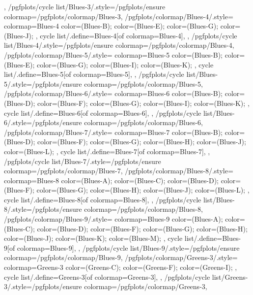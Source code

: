 {{  },
  /pgfplots/cycle list/Blues-3/.style={/pgfplots/ensure colormap={/pgfplots/colormap/Blues-3}},
  /pgfplots/colormap/Blues-4/.style={
    colormap={Blues-4}{
      color=(Blues-B);
      color=(Blues-E);
      color=(Blues-G);
      color=(Blues-J);
    },
    cycle list/.define={Blues-4}{[of colormap=Blues-4]},
  },
  /pgfplots/cycle list/Blues-4/.style={/pgfplots/ensure colormap={/pgfplots/colormap/Blues-4}},
  /pgfplots/colormap/Blues-5/.style={
    colormap={Blues-5}{
      color=(Blues-B);
      color=(Blues-E);
      color=(Blues-G);
      color=(Blues-I);
      color=(Blues-K);
    },
    cycle list/.define={Blues-5}{[of colormap=Blues-5]},
  },
  /pgfplots/cycle list/Blues-5/.style={/pgfplots/ensure colormap={/pgfplots/colormap/Blues-5}},
  /pgfplots/colormap/Blues-6/.style={
    colormap={Blues-6}{
      color=(Blues-B);
      color=(Blues-D);
      color=(Blues-F);
      color=(Blues-G);
      color=(Blues-I);
      color=(Blues-K);
    },
    cycle list/.define={Blues-6}{[of colormap=Blues-6]},
  },
  /pgfplots/cycle list/Blues-6/.style={/pgfplots/ensure colormap={/pgfplots/colormap/Blues-6}},
  /pgfplots/colormap/Blues-7/.style={
    colormap={Blues-7}{
      color=(Blues-B);
      color=(Blues-D);
      color=(Blues-F);
      color=(Blues-G);
      color=(Blues-H);
      color=(Blues-J);
      color=(Blues-L);
    },
    cycle list/.define={Blues-7}{[of colormap=Blues-7]},
  },
  /pgfplots/cycle list/Blues-7/.style={/pgfplots/ensure colormap={/pgfplots/colormap/Blues-7}},
  /pgfplots/colormap/Blues-8/.style={
    colormap={Blues-8}{
      color=(Blues-A);
      color=(Blues-C);
      color=(Blues-D);
      color=(Blues-F);
      color=(Blues-G);
      color=(Blues-H);
      color=(Blues-J);
      color=(Blues-L);
    },
    cycle list/.define={Blues-8}{[of colormap=Blues-8]},
  },
  /pgfplots/cycle list/Blues-8/.style={/pgfplots/ensure colormap={/pgfplots/colormap/Blues-8}},
  /pgfplots/colormap/Blues-9/.style={
    colormap={Blues-9}{
      color=(Blues-A);
      color=(Blues-C);
      color=(Blues-D);
      color=(Blues-F);
      color=(Blues-G);
      color=(Blues-H);
      color=(Blues-J);
      color=(Blues-K);
      color=(Blues-M);
    },
    cycle list/.define={Blues-9}{[of colormap=Blues-9]},
  },
  /pgfplots/cycle list/Blues-9/.style={/pgfplots/ensure colormap={/pgfplots/colormap/Blues-9}},
  /pgfplots/colormap/Greens-3/.style={
    colormap={Greens-3}{
      color=(Greens-C);
      color=(Greens-F);
      color=(Greens-I);
    },
    cycle list/.define={Greens-3}{[of colormap=Greens-3]},
  },
  /pgfplots/cycle list/Greens-3/.style={/pgfplots/ensure colormap={/pgfplots/colormap/Greens-3}},
}
